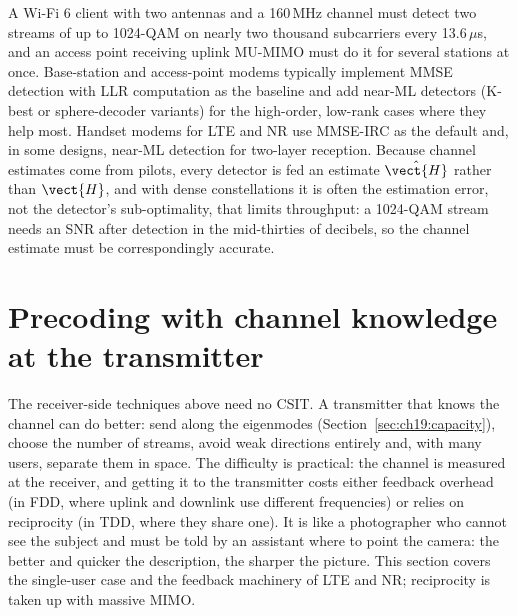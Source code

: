 \begin{inpractice}
A Wi-Fi 6 client with two antennas and a 160\,MHz channel must detect two streams of up to
1024-QAM on nearly two thousand subcarriers every 13.6\,$\mu$s, and an access point receiving uplink
MU-MIMO must do it for several stations at once. Base-station and access-point modems typically
implement MMSE detection with LLR computation as the baseline and add near-ML detectors (K-best or
sphere-decoder variants) for the high-order, low-rank cases where they help most. Handset modems
for LTE and NR use MMSE-IRC as the default and, in some designs, near-ML detection for two-layer
reception. Because channel estimates come from pilots, every detector is fed an estimate
$\hat{\vect{H}}$ rather than $\vect{H}$, and with dense constellations it is often the estimation
error, not the detector's sub-optimality, that limits throughput: a 1024-QAM stream needs an
SNR after detection in the mid-thirties of decibels, so the channel estimate must be correspondingly
accurate.
\end{inpractice}


\section{Precoding with channel knowledge at the transmitter}
\label{sec:ch19:precoding}

The receiver-side techniques above need no CSIT. A transmitter that knows the channel can do
better: send along the eigenmodes (Section~\ref{sec:ch19:capacity}), choose the number of streams,
avoid weak directions entirely and, with many users, separate them in space. The difficulty is
practical: the channel is measured at the receiver, and getting it to the transmitter costs
either feedback overhead (in FDD, where uplink and downlink use different frequencies) or relies
on reciprocity (in TDD, where they share one). It is like a photographer who cannot see the
subject and must be told by an assistant where to point the camera: the better and quicker the
description, the sharper the picture. This section covers the single-user case and the feedback
machinery of LTE and NR; reciprocity is taken up with massive MIMO.

